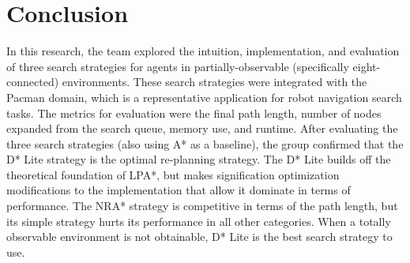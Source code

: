 \section{Conclusion}
In this research, the team explored the intuition, implementation, and evaluation of three search strategies for agents in  partially-observable (specifically eight-connected) environments. These search strategies were integrated with the Pacman domain, which is a representative application for robot navigation search tasks. The metrics for evaluation were the final path length, number of nodes expanded from the search queue, memory use, and runtime. After evaluating the three search strategies (also using A* as a baseline), the group confirmed that the D* Lite strategy is the optimal re-planning strategy. The D* Lite builds off the theoretical foundation of LPA*, but makes signification optimization modifications to the implementation that allow it dominate in terms of performance. The NRA* strategy is competitive in terms of the path length, but its simple strategy hurts its performance in all other categories. When a totally observable environment is not obtainable, D* Lite is the best search strategy to use. 